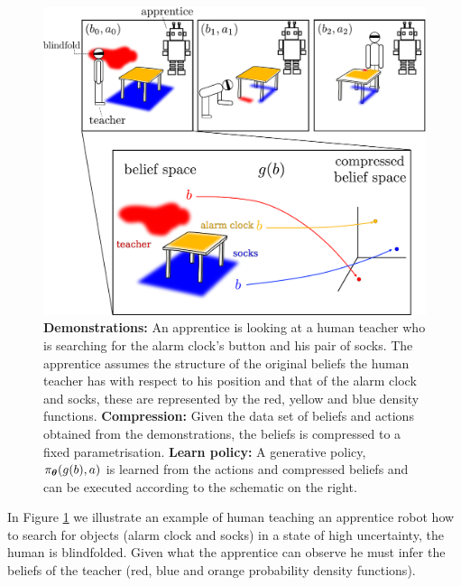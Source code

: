 \begin{figure}
 \centering
 \includegraphics[width=\textwidth]{./ch2-Background/Figures/human_search.pdf}
 \caption{\textbf{Demonstrations:} An apprentice is looking at a human teacher who is searching for the
 alarm clock's button and his pair of socks. The apprentice assumes the structure of the original beliefs the human teacher has with respect to his 
 position and that of the alarm clock and socks, these are represented by the red, yellow and blue density functions. \textbf{Compression:} Given the data set of beliefs and actions obtained from the demonstrations, the beliefs 
 is compressed to a fixed parametrisation. \textbf{Learn policy:} A generative policy, $\operatorname{\pi_{\boldsymbol{\theta}}}(g(b),a)$ is learned from the actions and compressed beliefs and can be executed 
 according to the schematic on the right. }
 \label{fig:human_search}
\end{figure}

In Figure \ref{fig:human_search} we illustrate an example of human teaching an apprentice robot how to search for 
objects (alarm clock and socks) in a state of high uncertainty, the human is blindfolded. Given what the apprentice can 
observe he must infer the beliefs of the teacher (red, blue and orange probability density functions).

